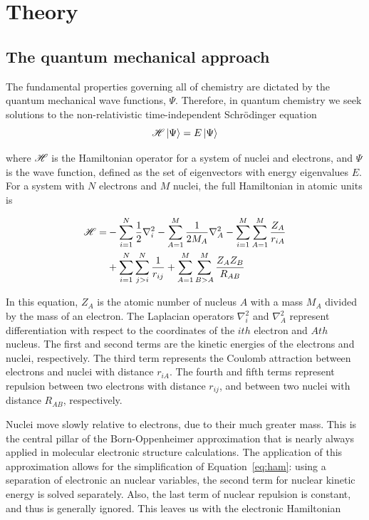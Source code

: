 
\chapter{Theory}
\label{ch:theory}

\section{The quantum mechanical approach}

The fundamental properties governing all of chemistry are dictated by the quantum mechanical wave functions, $\Psi$. Therefore, in quantum chemistry we seek solutions to the non-relativistic time-independent Schr{\"o}dinger equation
\begin{equation}
\mathscr{H} \ket{\Psi} = E \ket{\Psi}
\label{eq:schrodinger}
\end{equation}

\noindent where $\mathscr{H}$ is the Hamiltonian operator for a system of nuclei and electrons, and $\Psi$ is the wave function, defined as the set of eigenvectors with energy eigenvalues $E$.\cite{Griffiths2016} For a system with $N$ electrons and $M$ nuclei, the full Hamiltonian in atomic units is

\begin{equation}
\begin{split}
\mathscr{H} = &-\sum_{i=1}^N \frac{1}{2}\nabla_i^2 - \sum_{A=1}^M\frac{1}{2M_A}\nabla_A^2
-\sum_{i=1}^M\sum_{A=1}^M\frac{Z_A}{r_{iA}} \\
&+ \sum_{i=1}^N\sum_{j>i}^N \frac{1}{r_{ij}} + \sum_{A=1}^M\sum_{B>A}^M
\frac{Z_A Z_B}{R_{AB}}
\label{eq:ham}
\end{split}
\end{equation}

\noindent In this equation, $Z_A$ is the atomic number of nucleus $A$ with a mass $M_A$ divided by the mass of an electron. The Laplacian operators $\nabla_i^2$ and $\nabla_A^2$ represent differentiation with respect to the coordinates of the $ith$ electron and $Ath$ nucleus. The first and second terms are the kinetic energies of the electrons and nuclei, respectively. The third term represents the Coulomb attraction between electrons and nuclei with distance $r_{iA}$. The fourth and fifth terms represent repulsion between two electrons with distance $r_{ij}$, and between two nuclei with distance $R_{AB}$, respectively.

Nuclei move slowly relative to electrons, due to their much greater mass. This is the central pillar of the Born-Oppenheimer approximation that is nearly always applied in molecular electronic structure calculations. The application of this approximation allows for the simplification of Equation~\ref{eq:ham}: using a separation of electronic an nuclear variables, the second term for nuclear kinetic energy is solved separately. Also, the last term of nuclear repulsion is constant, and thus is generally ignored. This leaves us with the electronic Hamiltonian

